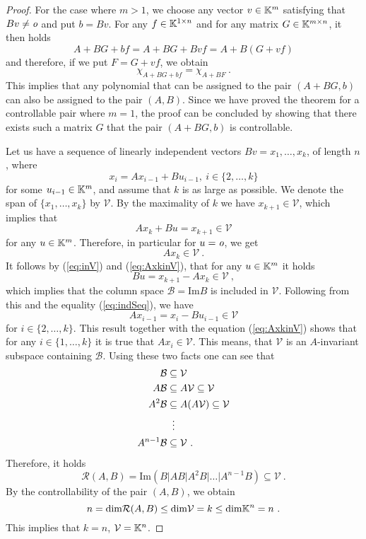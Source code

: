 \begin{proof}
    For the case where $m>1$, we choose any vector $v\in\mathbb{K}^m$ satisfying that $Bv\neq \textit{o}$ and put $b=Bv$. For any $f\in\mathbb{K}^{1\times n}$ and for any matrix $G\in\mathbb{K}^{m\times n}$, it then holds
    $${A+BG+bf}={A+BG+Bvf}={A+B(G+vf)}$$
    and therefore, if we put $F=G+vf$, we obtain 
    $$\chi_{A+BG+bf}=\chi_{A+BF}\ .$$
    This implies that any polynomial that can be assigned to the pair $(A+BG,b)$ can also be assigned to the pair $(A,B)$. Since we have proved the theorem for a controllable pair where $m=1$, the proof can be concluded by showing that there exists such a matrix $G$ that the pair $(A+BG,b)$ is controllable.
       
    Let us have a sequence of linearly independent vectors $Bv=x_1,\ldots,x_k$, of length $n$, where
    \begin{equation}
    \label{eq:indSeq}
        x_{i}=Ax_{i-1}+Bu_{i-1},\ i\in\{2,\ldots,k\}
    \end{equation}
    for some $u_{i-1}\in\mathbb{K}^m$, and assume that $k$ is as large as possible. We denote the span of $\{x_1,\ldots,x_k\}$ by $\mathcal{V}$. By the maximality of $k$ we have $x_{k+1}\in\mathcal{V}$, which implies that
    \begin{equation}
    \label{eq:inV}    
        Ax_k+Bu=x_{k+1}\in\mathcal{V}
    \end{equation}
    for any $u\in\mathbb{K}^m$. Therefore, in particular for $u=\textit{o}$, we get 
    \begin{equation}
    \label{eq:AxkinV}
        Ax_k\in\mathcal{V}\ .
    \end{equation}
    It follows by (\ref{eq:inV}) and (\ref{eq:AxkinV}), that for any $u\in\mathbb{K}^m$ it holds
    $$Bu=x_{k+1}-Ax_k\in\mathcal{V}\ ,$$
    which implies that the column space $\mathcal{B}=\text{Im}B$ is included in $\mathcal{V}$. Following from this and the equality (\ref{eq:indSeq}), we have 
    $$Ax_{i-1}=x_i-Bu_{i-1}\in\mathcal{V}$$
    for $i\in\{2,\ldots,k\}$. This result together with the equation (\ref{eq:AxkinV}) shows that for any $i\in\{1,\ldots,k\}$ it is true that $Ax_i\in\mathcal{V}$. This means, that $\mathcal{V}$ is an $A$-invariant subspace containing $\mathcal{B}$. Using these two facts one can see that 
    \begin{align*}
        \mathcal{B}&\subseteq\mathcal{V} \\
        A\mathcal{B}&\subseteq A\mathcal{V}\subseteq\mathcal{V} \\
        A^2\mathcal{B}&\subseteq A(A\mathcal{V})\subseteq\mathcal{V} \\
        &\vdotswithin{\subseteq} \\
        A^{n-1}\mathcal{B}&\subseteq\mathcal{V}
        \ .
    \end{align*}
    Therefore, it holds
    $$\mathcal{R}(A,B)=\text{Im}(B|AB|A^2B|\ldots|A^{n-1}B)\subseteq\mathcal{V}\ .$$
    By the controllability of the pair $(A,B)$, we obtain
    $$n=\text{dim}\mathcal{R}(A,B)\leq\text{dim}\mathcal{V}=k\leq\text{dim}\K^n=n\ .$$
    This implies that $k=n$, $\mathcal{V}=\mathbb{K}^n$.


\end{proof}
